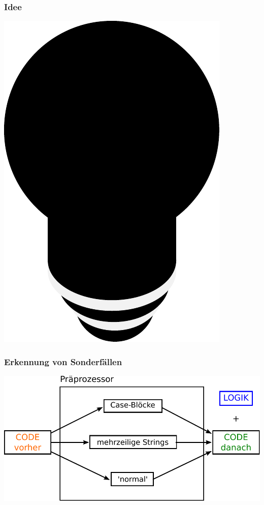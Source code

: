 \begin{frame}
\frametitle{Idee}
\begin{center}
\includegraphics[scale=0.5]{preprocessor/pics/Idee}
\end{center}
\end{frame}

\begin{frame}
\frametitle{Erkennung von Sonderfällen}
	\includegraphics[scale=0.70]{preprocessor/pics/CodeArten}
\end{frame}

